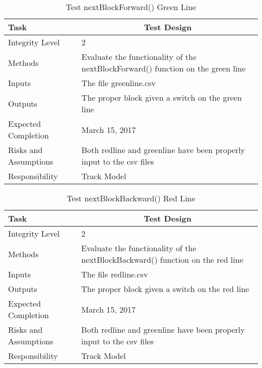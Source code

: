 \documentclass[]{article}
\begin{document}
\begin{table}[H]
	\centering
	\caption{Test nextBlockForward() Green Line}
	\begin{tabular}{|l|l|}
		\hline
		Task & \multicolumn{1}{c|}{Test Design} \\ \hline
		Integrity Level & 2 \\ \hline
		Methods & Evaluate the functionality of the nextBlockForward() function on the green line \\ \hline
		Inputs &  The file greenline.csv \\ \hline
		Outputs &  The proper block given a switch on the green line\\ \hline
		Expected Completion & March 15, 2017\\ \hline
		Risks and Assumptions & Both redline and greenline have been properly input to the csv files \\ \hline
		Responsibility & Track Model\\ \hline
	\end{tabular}
\end{table}

\begin{table}[H]
	\centering
	\caption{Test nextBlockBackward() Red Line}
	\begin{tabular}{|l|l|}
		\hline
		Task & \multicolumn{1}{c|}{Test Design} \\ \hline
		Integrity Level & 2 \\ \hline
		Methods & \parbox[t]{10cm}{Evaluate the functionality of the nextBlockBackward() function on the red line} \\ \hline
		Inputs &  The file redline.csv \\ \hline
		Outputs &  The proper block given a switch on the red line\\ \hline
		Expected Completion & March 15, 2017\\ \hline
		Risks and Assumptions & Both redline and greenline have been properly input to the csv files \\ \hline
		Responsibility & Track Model\\ \hline
	\end{tabular}
\end{table}
\end{document}
